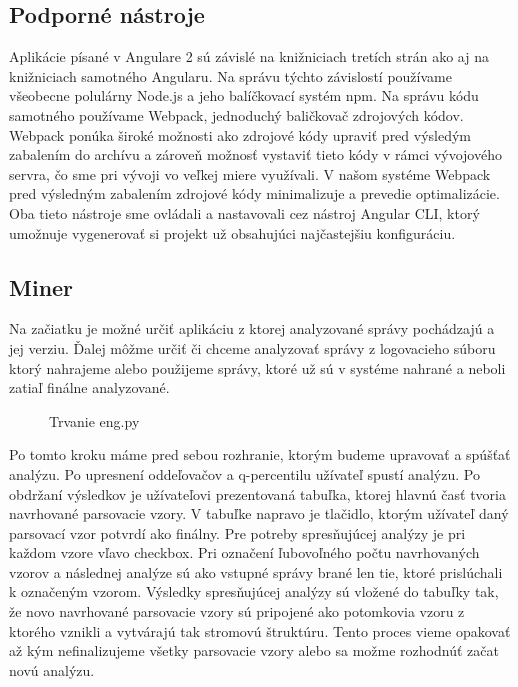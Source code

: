 \subsection{Podporné nástroje}
Aplikácie písané v Angulare 2 sú závislé na knižniciach tretích strán ako aj na knižniciach samotného Angularu. Na správu týchto závislostí používame všeobecne polulárny Node.js a jeho balíčkovací systém npm. Na správu kódu samotného používame Webpack, jednoduchý baličkovač zdrojových kódov. Webpack ponúka široké možnosti ako zdrojové kódy upraviť pred výsledým zabalením do archívu a zároveň možnosť vystaviť tieto kódy v rámci vývojového servra, čo sme pri vývoji vo veľkej miere využívali. V našom systéme Webpack pred výsledným zabalením zdrojové kódy minimalizuje a prevedie optimalizácie. Oba tieto nástroje sme ovládali a nastavovali cez nástroj Angular CLI, ktorý umožnuje vygenerovať si projekt už obsahujúci najčastejšiu konfiguráciu. 


\subsection{Miner}
Na začiatku je možné určiť aplikáciu z ktorej analyzované správy pochádzajú a jej verziu. Ďalej môžme určiť či chceme analyzovať správy z  logovacieho súboru ktorý nahrajeme alebo použijeme správy, ktoré už sú v systéme nahrané a neboli zatiaľ finálne analyzované.

\begin{figure}[htbp]
 \centering 
 \begin{minipage}{0.95\linewidth}
 	\centering
 \end{minipage}
  \caption{Trvanie eng.py }
  \label{fig:eng-duration}
\end{figure}

Po tomto kroku máme pred sebou rozhranie, ktorým budeme upravovať a spúšťať analýzu. Po upresnení oddeľovačov a q-percentilu užívateľ spustí analýzu. Po obdržaní výsledkov je užívateľovi prezentovaná tabuľka, ktorej hlavnú časť tvoria navrhované parsovacie vzory. V tabuľke napravo je tlačidlo, ktorým užívateľ daný parsovací vzor potvrdí ako finálny. Pre potreby spresňujúcej analýzy je pri každom vzore vľavo checkbox. Pri označení ľubovoľného počtu navrhovaných vzorov a následnej analýze sú ako vstupné správy brané len tie, ktoré prislúchali k označeným vzorom. Výsledky spresňujúcej analýzy sú vložené do tabuľky tak, že novo navrhované parsovacie vzory sú pripojené ako potomkovia vzoru z ktorého vznikli a vytvárajú tak stromovú štruktúru. Tento proces vieme opakovať až kým nefinalizujeme všetky parsovacie vzory alebo sa možme rozhodnúť začat novú analýzu.

